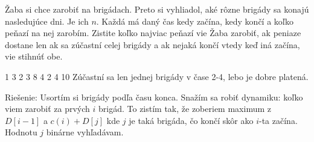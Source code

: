 
Žaba si chce zarobiť na brigádach. Preto si vyhliadol, aké
rôzne brigády sa konajú nasledujúce dni. Je ich $n$. Každá
má daný čas kedy začína, kedy končí a koľko peňazí na nej
zarobím. Zistite koľko najviac peňazí vie Žaba zarobiť, ak
peniaze dostane len ak sa zúčastní celej brigády a ak nejaká
končí vtedy keď iná začína, vie stihnúť obe.

1 3 2
3 8 4
2 4 10
\komentar
Zúčastní sa len jednej brigády v čase 2-4, lebo je dobre platená.
\koniec

Riešenie: Usortím si brigády podľa času konca. Snažím sa robiť dynamiku:
koľko viem zarobiť za prvých $i$ brigád. To zistím tak, že zoberiem maximum
z $D[i-1]$ a $c(i)+D[j]$ kde $j$
je taká brigáda, čo končí skôr ako $i$-ta
začína. Hodnotu $j$ binárne vyhľadávam.
